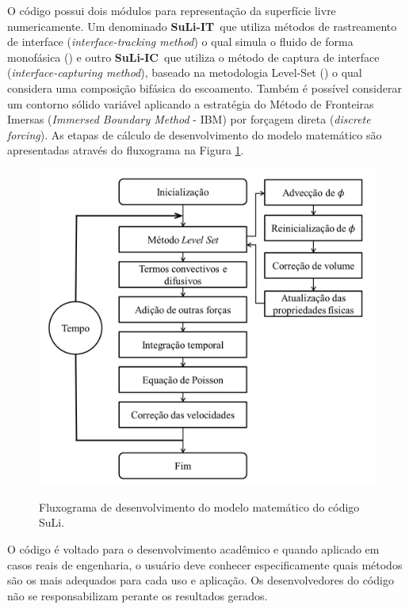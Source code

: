 \documentclass[12pt, a4paper]{article}
\newcommand{\SLIT}{{\bf SuLi-IT}}
\newcommand{\SLIC}{{\bf SuLi-IC}}
\begin{document}
O código possui dois módulos para representação da superfície livre numericamente. Um denominado \SLIT\ que utiliza métodos de rastreamento de interface (\textit{interface-tracking method}) o qual simula o fluido de forma monofásica (\cite{monteiro2014}) e outro \SLIC\ que utiliza o método de captura de interface (\textit{interface-capturing method}), baseado na metodologia Level-Set (\cite{monteiro2019}) o qual considera uma composição bifásica do escoamento. Também é possível considerar um contorno sólido variável aplicando a estratégia do Método de Fronteiras Imersas (\textit{Immersed Boundary Method} - IBM) por forçagem direta (\textit{discrete forcing}). As etapas de cálculo de desenvolvimento do modelo matemático são apresentadas através do fluxograma na Figura \ref{fig:suli}. %

    \begin{figure} [!htb] 
    \centering
    \caption{Fluxograma de desenvolvimento do modelo matemático do código SuLi.}
    \includegraphics[width=13cm]{Suli_fluxograma.jpeg}
    \label{fig:suli}
    \end{figure}

O código é voltado para o desenvolvimento acadêmico e quando aplicado em casos reais de engenharia, o usuário deve conhecer especificamente quais métodos são os mais adequados para cada uso e aplicação. Os desenvolvedores do código não se responsabilizam perante os resultados gerados.
\end{document}
